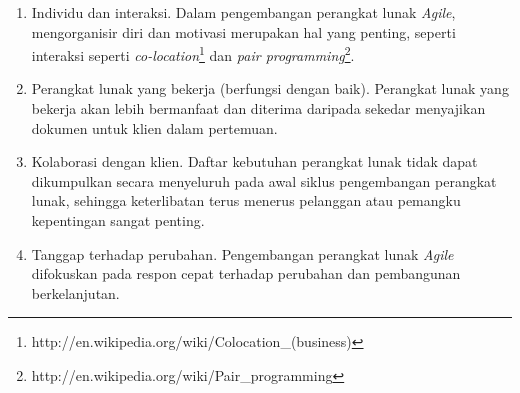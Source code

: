 \documentclass[a4paper, 12pt, oneside]{report}
\begin{document}
\begin{enumerate}
  \item Individu dan interaksi. Dalam pengembangan perangkat lunak \textit{Agile}, \\mengorganisir diri dan motivasi merupakan hal yang penting, seperti interaksi seperti \textit{co-location}\footnote{http://en.wikipedia.org/wiki/Colocation\_(business)} dan \textit{pair programming}\footnote{http://en.wikipedia.org/wiki/Pair\_programming}.
  \item Perangkat lunak yang bekerja (berfungsi dengan baik). Perangkat lunak yang bekerja akan lebih bermanfaat dan diterima daripada sekedar menyajikan dokumen untuk klien dalam pertemuan.
  \item Kolaborasi dengan klien. Daftar kebutuhan perangkat lunak tidak dapat \newline dikumpulkan secara menyeluruh pada awal siklus pengembangan perangkat lunak, sehingga keterlibatan terus menerus pelanggan atau pemangku kepentingan sangat penting.
  \item Tanggap terhadap perubahan. Pengembangan perangkat lunak \textit{Agile} difokuskan pada respon cepat terhadap perubahan dan pembangunan berkelanjutan.
\end{enumerate}
\end{document}
